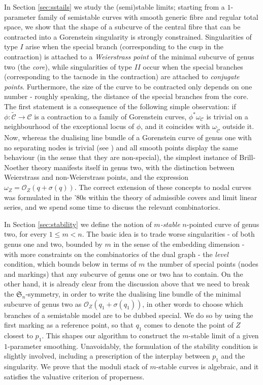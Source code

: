 \documentclass{compositio}
\newcommand{\OO}{\mathcal O}
\renewcommand{\to}{\rightarrow}
\theoremstyle{plain}
\theoremstyle{definition}
\theoremstyle{remark}
\begin{document}
In Section \ref{sec:sstails} we study the (semi)stable limits; starting from a $1$-parameter family of semistable curves with smooth generic fibre and regular total space, we show that the shape of a subcurve of the central fibre that can be contracted into a Gorenstein singularity is strongly constrained. Singularities of type $I$ arise when the special branch (corresponding to the cusp in the contraction) is attached to a \emph{Weierstrass point} of the minimal subcurve of genus two (the \emph{core}), while singularities of type $I\!I$ occur when the special branches (corresponding to the tacnode in the contraction) are attached to \emph{conjugate points}. Furthermore, the size of the curve to be contracted only depends on one number - roughly speaking, the distance of the special branches from the core. The first statement is a consequence of the following simple observation: if $\phi\colon\widetilde{\mathcal C}\to\mathcal C$ is a contraction to a family of Gorenstein curves, $\phi^*\omega_{\mathcal C}$ is trivial on a neighbourhood of the exceptional locus of $\phi$, and it coincides with $\omega_{\widetilde{\mathcal C}}$ outside it. Now, whereas the dualising line bundle of a Gorenstein curve of genus one with no separating nodes is trivial (see \cite[Lemma 3.3]{SMY1}) and all smooth points display the same behaviour (in the sense that they are non-special), the simplest instance of Brill-Noether theory manifests itself in genus two, with the distinction between Weierstrass and non-Weierstrass points, and the expression $\omega_Z=\OO_Z(q+\sigma(q))$. The correct extension of these concepts to nodal curves was formulated in the '80s within the theory of admissible covers and limit linear series, and we spend some time to discuss the relevant combinatorics.

In Section \ref{sec:stability} we define the notion of \emph{$m$-stable} $n$-pointed curve of genus two, for every $1\leq m<n$. The basic idea is to trade worse singularities - of both genus one and two, bounded by $m$ in the sense of the embedding dimension - with more constraints on the combinatorics of the dual graph - the \emph{level} condition, which bounds below in terms of $m$ the number of special points (nodes and markings) that any subcurve of genus one or two has to contain. On the other hand, it is already clear from the discussion above that we need to break the $\mathfrak S_n$-symmetry, in order to write the dualising line bundle of the minimal subcurve of genus two as $\OO_Z(q_1+\sigma(q_1))$, in other words to choose which branches of a semistable model are to be dubbed special. We do so by using the first marking as a reference point, so that $q_1$ comes to denote the point of $Z$ closest to $p_1$. This shapes our algorithm to construct the $m$-stable limit of a given $1$-parameter smoothing. Unavoidably, the formulation of the stability condition is slightly involved, including a prescription of the interplay between $p_1$ and the singularity. We prove that the moduli stack of $m$-stable curves is algebraic, and it satisfies the valuative criterion of properness.
\end{document}
